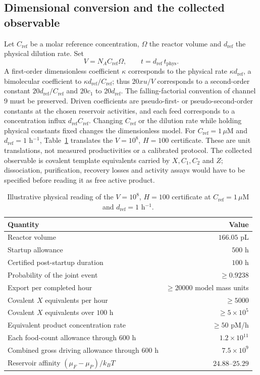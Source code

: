 \documentclass[11pt,a4paper]{article}
\theoremstyle{plain}
\theoremstyle{definition}
\theoremstyle{remark}
\begin{document}
\subsection{Dimensional conversion and the collected observable}
Let $C_{\mathrm{ref}}$ be a molar reference concentration, $\Omega$ the reactor volume and $d_{\mathrm{ref}}$ the physical dilution rate. Set
\begin{equation}\label{eq:units}
 V=N_AC_{\mathrm{ref}}\Omega,\qquad t=d_{\mathrm{ref}}\,t_{\mathrm{phys}}.
\end{equation}
A first-order dimensionless coefficient $\kappa$ corresponds to the physical rate $\kappa d_{\mathrm{ref}}$, a bimolecular coefficient to $\kappa d_{\mathrm{ref}}/C_{\mathrm{ref}}$; thus $20xu/V$ corresponds to a second-order constant $20d_{\mathrm{ref}}/C_{\mathrm{ref}}$ and $20c_1$ to $20d_{\mathrm{ref}}$. The falling-factorial convention of channel $9$ must be preserved. Driven coefficients are pseudo-first- or pseudo-second-order constants at the chosen reservoir activities, and each feed corresponds to a concentration influx $d_{\mathrm{ref}}C_{\mathrm{ref}}$. Changing $C_{\mathrm{ref}}$ or the dilution rate while holding physical constants fixed changes the dimensionless model. For $C_{\mathrm{ref}}=1\,\mu$M and $d_{\mathrm{ref}}=1$ h$^{-1}$, Table~\ref{tab:example} translates the $V=10^8$, $H=100$ certificate. These are unit translations, not measured productivities or a calibrated protocol. The collected observable is covalent template equivalents carried by $X,C_1,C_2$ and $Z$; dissociation, purification, recovery losses and activity assays would have to be specified before reading it as free active product.

\begin{table}[t]\centering
\caption{Illustrative physical reading of the $V=10^8$, $H=100$ certificate at $C_{\mathrm{ref}}=1\,\mu$M and $d_{\mathrm{ref}}=1$ h$^{-1}$.}\label{tab:example}
\begin{tabular}{lr}\toprule Quantity & Value\\\midrule
Reactor volume & $166.05$ pL\\
Startup allowance & $500$ h\\
Certified post-startup duration & $100$ h\\
Probability of the joint event & $\ge0.9238$\\
Export per completed hour & $\ge20000$ model mass units\\
Covalent $X$ equivalents per hour & $\ge5000$\\
Covalent $X$ equivalents over $100$ h & $\ge5\times10^5$\\
Equivalent product concentration rate & $\ge50$ pM/h\\
Each food-count allowance through $600$ h & $1.2\times10^{11}$\\
Combined gross driving allowance through $600$ h & $7.5\times10^9$\\
Reservoir affinity $(\mu_F-\mu_P)/k_BT$ & $24.88$--$25.29$\\\bottomrule
\end{tabular}
\end{table}
\end{document}
